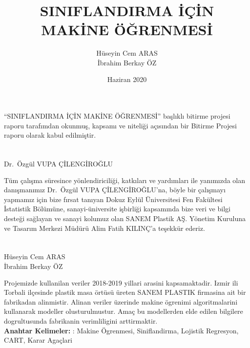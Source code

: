 \documentclass[12pt,twoside]{deuthesis}
\title{SINIFLANDIRMA İÇİN MAKİNE ÖĞRENMESİ}
\author{Hüseyin Cem ARAS \\ İbrahim Berkay ÖZ} %
\date{Haziran 2020}
\begin{document}
  \maketitle

\frontmatter %
\pagestyle{empty} %
\begin{preface}
	``SINIFLANDIRMA İÇİN MAKİNE ÖĞRENMESİ'' başlıklı bitirme projesi raporu tarafımdan okunmuş, kapsamı ve niteliği açısından bir Bitirme Projesi raporu olarak kabul edilmiştir.\\
 ~\\
 ~\\
 Dr.~Özgül VUPA ÇİLENGİROĞLU
\end{preface}
  \begin{acknowledgements}
    Tüm çalışma süresince yönlendiriciliği, katkıları ve yardımları ile yanımızda olan danışmanımız Dr.~Özgül VUPA ÇİLENGİROĞLU'na, böyle bir çalışmayı yapmamız için bize fırsat tanıyan Dokuz Eylül Üniversitesi Fen Fakültesi İstatistik Bölümüne, sanayi-üniversite işbirliği kapsamında bize veri ve bilgi desteği sağlayan ve sanayi kolumuz olan SANEM Plastik AŞ. Yönetim Kuruluna ve Tasarım Merkezi Müdürü Alim Fatih KILINÇ'a teşekkür ederiz.\\
    ~\\
    ~\\
    Hüseyin Cem ARAS\\
    İbrahim Berkay ÖZ\\
  \end{acknowledgements}
\begin{abstractTR}
	Projemizde kullanilan veriler 2018-2019 yillari arasini kapsamaktadir. Izmir ili Torbali ilçesinde plastik masa örtüsü üreten SANEM PLASTIK firmasina ait bir fabrikadan alinmistir. Alinan veriler üzerinde makine ögrenimi algoritmalarini kullanarak modeller olusturulmustur. Amaç bu modellerden elde edilen bilgilere dogrultusunda fabrikanin verimliligini arttirmaktir.\\
 \textbf{Anahtar Kelimeler:} : Makine Ögrenmesi, Siniflandirma, Lojistik Regresyon, CART, Karar Agaçlari
\end{abstractTR}


  \hypersetup{linkcolor=black}
  \setcounter{tocdepth}{2}
  \tableofcontents

  \listoftables

  \listoffigures


\mainmatter %
\pagestyle{fancyplain} %
\end{document}
